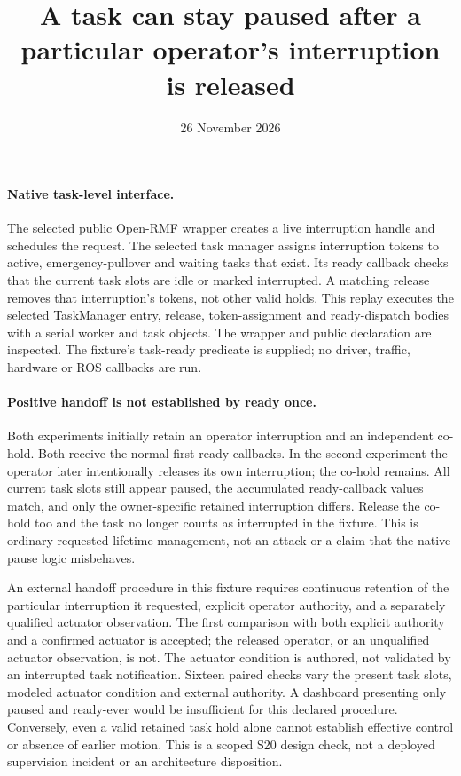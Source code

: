 \documentclass[11pt]{article}
\title{A task can stay paused after a particular operator's interruption is released}
\date{26 November 2026}
\begin{document}
\maketitle
\paragraph{Native task-level interface.}
The selected public Open-RMF wrapper creates a live interruption handle
and schedules the request. The selected task manager assigns interruption
tokens to active, emergency-pullover and waiting tasks that exist.
Its ready callback checks that the current task slots are idle or marked
interrupted. A matching release removes that interruption's tokens, not
other valid holds. This replay executes the selected TaskManager entry,
release, token-assignment and ready-dispatch bodies with a serial worker
and task objects. The wrapper and public declaration are inspected.
The fixture's task-ready predicate is supplied; no driver, traffic,
hardware or ROS callbacks are run.

\paragraph{Positive handoff is not established by ready once.}
Both experiments initially retain an operator interruption and an
independent co-hold. Both receive the normal first ready callbacks.
In the second experiment the operator later intentionally releases
its own interruption; the co-hold remains. All current task slots
still appear paused, the accumulated ready-callback values match,
and only the owner-specific retained interruption differs. Release
the co-hold too and the task no longer counts as interrupted in
the fixture. This is ordinary requested lifetime management, not
an attack or a claim that the native pause logic misbehaves.

An external handoff procedure in this fixture requires continuous
retention of the particular interruption it requested, explicit
operator authority, and a separately qualified actuator observation.
The first comparison with both explicit authority and a confirmed actuator
is accepted;
the released operator, or an unqualified actuator observation,
is not. The actuator condition is authored, not validated by
an interrupted task notification. Sixteen paired checks vary the
present task slots, modeled actuator condition and external authority.
A dashboard presenting only paused and ready-ever would be
insufficient for this declared procedure. Conversely, even a
valid retained task hold alone cannot establish effective control
or absence of earlier motion. This is a scoped S20 design check,
not a deployed supervision incident or an architecture disposition.
\end{document}

